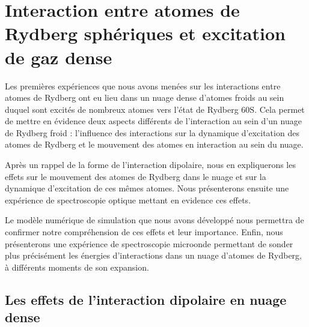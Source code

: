 \chapter{Interaction entre atomes de Rydberg sphériques et excitation de gaz dense}
\label{chapter:60s}
\noindent Les premières expériences que nous avons menées sur les interactions entre atomes de Rydberg ont eu lieu dans un nuage dense d'atomes froids au sein duquel sont excités de nombreux atomes vers l'état de Rydberg $\mathrm{60S}$.
Cela permet de mettre en évidence deux aspects différents de l'interaction au sein d'un nuage de Rydberg froid : l'influence des interactions sur la dynamique d'excitation des atomes de Rydberg et le mouvement des atomes en interaction au sein du nuage.

Après un rappel de la forme de l'interaction dipolaire, nous en expliquerons les effets sur le mouvement des atomes de Rydberg dans le nuage et sur la dynamique d'excitation de ces mêmes atomes.
Nous présenterons ensuite une expérience de spectroscopie optique mettant en evidence ces effets.

Le modèle numérique de simulation que nous avons développé nous permettra de confirmer notre compréhension de ces effets et leur importance.
Enfin, nous présenterons une expérience de spectroscopie microonde permettant de sonder plus précisément les énergies d'interactions dans un nuage d'atomes de Rydberg, à différents moments de son expansion.

\section{Les effets de l'interaction dipolaire en nuage dense}


